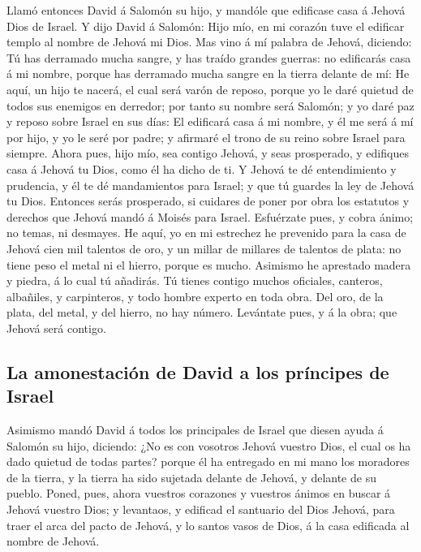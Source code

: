  Llamó entonces David á Salomón su hijo, y mandóle que
edificase casa á Jehová Dios de Israel.  Y dijo David á
Salomón: Hijo mío, en mi corazón tuve el edificar templo al nombre de
Jehová mi Dios.  Mas vino á mí palabra de Jehová, diciendo:
Tú has derramado mucha sangre, y has traído grandes guerras: no
edificarás casa á mi nombre, porque has derramado mucha sangre en la
tierra delante de mí:  He aquí, un hijo te nacerá, el cual
será varón de reposo, porque yo le daré quietud de todos sus enemigos en
derredor; por tanto su nombre será Salomón; y yo daré paz y reposo sobre
Israel en sus días:  El edificará casa á mi nombre, y él me
será á mí por hijo, y yo le seré por padre; y afirmaré el trono de su
reino sobre Israel para siempre.  Ahora pues, hijo mío, sea
contigo Jehová, y seas prosperado, y edifiques casa á Jehová tu Dios,
como él ha dicho de ti.  Y Jehová te dé entendimiento y
prudencia, y él te dé mandamientos para Israel; y que tú guardes la ley
de Jehová tu Dios.  Entonces serás prosperado, si cuidares
de poner por obra los estatutos y derechos que Jehová mandó á Moisés
para Israel. Esfuérzate pues, y cobra ánimo; no temas, ni desmayes.
 He aquí, yo en mi estrechez he prevenido para la casa de
Jehová cien mil talentos de oro, y un millar de millares de talentos de
plata: no tiene peso el metal ni el hierro, porque es mucho. Asimismo he
aprestado madera y piedra, á lo cual tú añadirás.  Tú
tienes contigo muchos oficiales, canteros, albañiles, y carpinteros, y
todo hombre experto en toda obra.  Del oro, de la plata,
del metal, y del hierro, no hay número. Levántate pues, y á la obra; que
Jehová será contigo.

\hypertarget{la-amonestaciuxf3n-de-david-a-los-pruxedncipes-de-israel}{%
\subsection{La amonestación de David a los príncipes de
Israel}\label{la-amonestaciuxf3n-de-david-a-los-pruxedncipes-de-israel}}

 Asimismo mandó David á todos los principales de Israel que
diesen ayuda á Salomón su hijo, diciendo:  ¿No es con
vosotros Jehová vuestro Dios, el cual os ha dado quietud de todas
partes? porque él ha entregado en mi mano los moradores de la tierra, y
la tierra ha sido sujetada delante de Jehová, y delante de su pueblo.
 Poned, pues, ahora vuestros corazones y vuestros ánimos en
buscar á Jehová vuestro Dios; y levantaos, y edificad el santuario del
Dios Jehová, para traer el arca del pacto de Jehová, y lo santos vasos
de Dios, á la casa edificada al nombre de Jehová.

